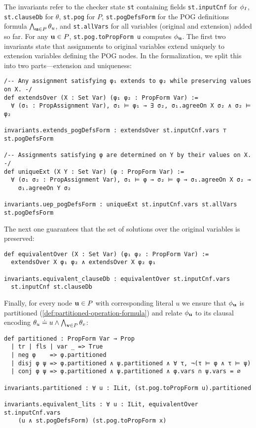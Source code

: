 The invariants refer to the checker state \lstinline{st} containing fields \lstinline{st.inputCnf} for $\phi_I$, \lstinline{st.clauseDb} for $\theta$, \lstinline{st.pog} for $P$, \lstinline{st.pogDefsForm} for the POG definitions formula $\bigwedge_{\mathbf{u}\in P}\theta_u$, and \lstinline{st.allVars} for all variables (original and extension) added so far. For any $\mathbf{u}\in P$, \lstinline{st.pog.toPropForm u} computes $\phi_{\mathbf{u}}$. The first two invariants state that assignments to original variables extend uniquely to extension variables defining the POG nodes. In the formalization, we split this into two parts---extension and uniqueness:
\begin{lstlisting}
/-- Any assignment satisfying φ₁ extends to φ₂ while preserving values on X. -/
def extendsOver (X : Set Var) (φ₁ φ₂ : PropForm Var) :=
  ∀ (σ₁ : PropAssignment Var), σ₁ ⊨ φ₁ → ∃ σ₂, σ₁.agreeOn X σ₂ ∧ σ₂ ⊨ φ₂

invariants.extends_pogDefsForm : extendsOver st.inputCnf.vars ⊤ st.pogDefsForm

/-- Assignments satisfying φ are determined on Y by their values on X. -/
def uniqueExt (X Y : Set Var) (φ : PropForm Var) :=
  ∀ (σ₁ σ₂ : PropAssignment Var), σ₁ ⊨ φ → σ₂ ⊨ φ → σ₁.agreeOn X σ₂ →
    σ₁.agreeOn Y σ₂

invariants.uep_pogDefsForm : uniqueExt st.inputCnf.vars st.allVars st.pogDefsForm
\end{lstlisting}
The next one guarantees that the set of solutions over the original variables is preserved:
\begin{lstlisting}
def equivalentOver (X : Set Var) (φ₁ φ₂ : PropForm Var) :=
  extendsOver X φ₁ φ₂ ∧ extendsOver X φ₂ φ₁

invariants.equivalent_clauseDb : equivalentOver st.inputCnf.vars
  st.inputCnf st.clauseDb
\end{lstlisting}
Finally, for every node $\mathbf{u}\in P$ with corresponding literal $u$ we ensure that $\phi_{\mathbf{u}}$ is partitioned (\cref{def:partitioned-operation-formula}) and relate $\phi_{\mathbf{u}}$ to its clausal encoding $\theta_u \doteq u \wedge \bigwedge_{\mathbf{v}\in P}\theta_v$:
\begin{lstlisting}
def partitioned : PropForm Var → Prop
  | tr | fls | var _ => True
  | neg φ    => φ.partitioned
  | disj φ ψ => φ.partitioned ∧ ψ.partitioned ∧ ∀ τ, ¬(τ ⊨ φ ∧ τ ⊨ ψ)
  | conj φ ψ => φ.partitioned ∧ ψ.partitioned ∧ φ.vars ∩ ψ.vars = ∅
 
invariants.partitioned : ∀ u : ILit, (st.pog.toPropForm u).partitioned

invariants.equivalent_lits : ∀ u : ILit, equivalentOver st.inputCnf.vars
    (u ∧ st.pogDefsForm) (st.pog.toPropForm x)
\end{lstlisting}
